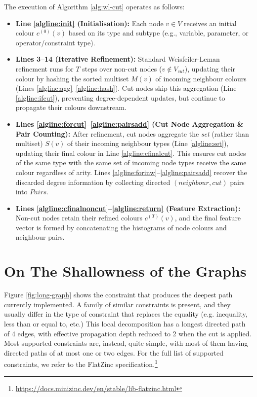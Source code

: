 The execution of Algorithm \ref{alg:wl-cut} operates as follows:
\begin{itemize}
    \item \textbf{Line \ref{algline:init} (Initialisation):} Each node $v \in V$ receives an initial colour $c^{(0)}(v)$ based on its type and subtype (e.g., variable, parameter, or operator/constraint type).
    \item \textbf{Lines 3--14 (Iterative Refinement):} Standard Weisfeiler-Leman refinement runs for $T$ steps over non-cut nodes ($v \notin V_{cut}$), updating their colour by hashing the sorted multiset $M(v)$ of incoming neighbour colours (Lines \ref{algline:agg}--\ref{algline:hash}). Cut nodes skip this aggregation (Line \ref{algline:ifcut}), preventing degree-dependent updates, but continue to propagate their colours downstream.
    \item \textbf{Lines \ref{algline:forcut}--\ref{algline:pairsadd} (Cut Node Aggregation \& Pair Counting):} After refinement, cut nodes aggregate the \emph{set} (rather than multiset) $S(v)$ of their incoming neighbour types (Line \ref{algline:set}), updating their final colour in Line \ref{algline:cfinalcut}. This ensures cut nodes of the same type with the same set of incoming node types receive the same colour regardless of arity. Lines \ref{algline:forinw}--\ref{algline:pairsadd} recover the discarded degree information by collecting directed $(neighbour, cut)$ pairs into $Pairs$.
    \item \textbf{Lines \ref{algline:cfinalnoncut}--\ref{algline:return} (Feature Extraction):} Non-cut nodes retain their refined colours $c^{(T)}(v)$, and the final feature vector is formed by concatenating the histograms of node colours and neighbour pairs.
\end{itemize}

\section{On The Shallowness of the Graphs}\label{sec:graph-depth}
Figure \ref{fig:long-graph} shows the constraint that produces the deepest path currently implemented. A family of similar constraints is present, and they usually differ in the type of constraint that replaces the equality (e.g. inequality, less than or equal to, etc.) This local decomposition has a longest directed path of 4 edges, with effective propagation depth reduced to 2 when the cut is applied. Most supported constraints are, instead, quite simple, with most of them having directed paths of at most one or two edges. For the full list of supported constraints, we refer to the FlatZinc specification.\footnote{\url{https://docs.minizinc.dev/en/stable/lib-flatzinc.html}}

